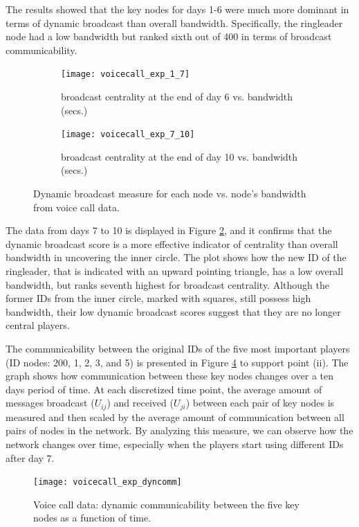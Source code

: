 The results showed that the key nodes for days 1-6 were much more dominant in terms of dynamic broadcast than overall bandwidth. Specifically, the ringleader node had a low bandwidth but ranked sixth out of 400 in terms of broadcast communicability.

\begin{figure}[h]
     \centering
     \begin{subfigure}[b]{0.49\textwidth}
         \centering
         \texttt{[image: voicecall\_exp\_1\_7]}
         \caption{broadcast centrality at the end of day 6 vs. bandwidth (secs.)}
         \label{fig:ve1a}
     \end{subfigure}
     \hfill
     \begin{subfigure}[b]{0.49\textwidth}
         \centering
         \texttt{[image: voicecall\_exp\_7\_10]}
         \caption{broadcast centrality at the end of day 10 vs. bandwidth (secs.)}
         \label{fig:ve1b}
     \end{subfigure}
     \caption{Dynamic broadcast measure for each node vs. node's bandwidth from voice call data.}
     \label{fig:ve1}
\end{figure}

The data from days 7 to 10 is displayed in Figure \ref{fig:ve1b}, and it confirms that the dynamic broadcast score is a more effective indicator of centrality than overall bandwidth in uncovering the inner circle. The plot shows how the new ID of the ringleader, that is indicated with an upward pointing triangle, has a low overall bandwidth, but ranks seventh highest for broadcast centrality. Although the former IDs from the inner circle, marked with squares, still possess high bandwidth, their low dynamic broadcast scores suggest that they are no longer central players.

The communicability between the original IDs of the five most important players (ID nodes: 200, 1, 2, 3, and 5) is presented in Figure \ref{fig:ve2} to support point (ii). The graph shows how communication between these key nodes changes over a ten days period of time. At each discretized time point, the average amount of messages broadcast ($U_{ij}$) and received ($U_{ji}$) between each pair of key nodes is measured and then scaled by the average amount of communication between all pairs of nodes in the network. By analyzing this measure, we can observe how the network changes over time, especially when the players start using different IDs after day 7.

\begin{figure}[h]\centering
    \texttt{[image: voicecall\_exp\_dyncomm]}
    \caption{Voice call data: dynamic communicability between the five key nodes as a function of time.}
    \label{fig:ve2}
    \bigskip
\end{figure}